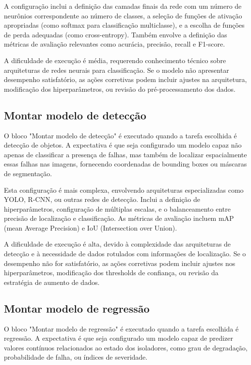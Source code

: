 A configuração inclui a definição das camadas finais da rede com um número de neurônios correspondente ao número de classes, a seleção de funções de ativação apropriadas (como softmax para classificação multiclasse), e a escolha de funções de perda adequadas (como cross-entropy). Também envolve a definição das métricas de avaliação relevantes como acurácia, precisão, recall e F1-score.

A dificuldade de execução é média, requerendo conhecimento técnico sobre arquiteturas de redes neurais para classificação. Se o modelo não apresentar desempenho satisfatório, as ações corretivas podem incluir ajustes na arquitetura, modificação dos hiperparâmetros, ou revisão do pré-processamento dos dados.

\subsection{Montar modelo de detecção}
O bloco "Montar modelo de detecção" é executado quando a tarefa escolhida é detecção de objetos. A expectativa é que seja configurado um modelo capaz não apenas de classificar a presença de falhas, mas também de localizar espacialmente essas falhas nas imagens, fornecendo coordenadas de bounding boxes ou máscaras de segmentação.

Esta configuração é mais complexa, envolvendo arquiteturas especializadas como YOLO, R-CNN, ou outras redes de detecção. Inclui a definição de hiperparâmetros, configuração de múltiplas escalas, e o balanceamento entre precisão de localização e classificação. As métricas de avaliação incluem mAP (mean Average Precision) e IoU (Intersection over Union).

A dificuldade de execução é alta, devido à complexidade das arquiteturas de detecção e à necessidade de dados rotulados com informações de localização. Se o desempenho não for satisfatório, as ações corretivas podem incluir ajustes nos hiperparâmetros, modificação dos thresholds de confiança, ou revisão da estratégia de aumento de dados.

\subsection{Montar modelo de regressão}
O bloco "Montar modelo de regressão" é executado quando a tarefa escolhida é regressão. A expectativa é que seja configurado um modelo capaz de predizer valores contínuos relacionados ao estado dos isoladores, como grau de degradação, probabilidade de falha, ou índices de severidade.

